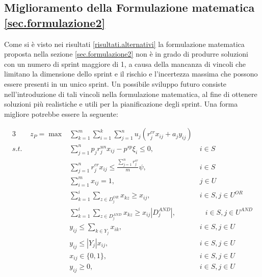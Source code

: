 \documentclass[12pt,a4paper,openright,twoside]{book}
\begin{document}
\subsection{Miglioramento della Formulazione matematica \ref{sec.formulazione2}}

Come si è visto nei risultati \ref{risultati.alternativi} la formulazione matematica proposta nella sezione \ref{sec.formulazione2} non è in grado di produrre soluzioni con un numero di sprint maggiore di 1, a causa della mancanza di vincoli che limitano la dimensione dello sprint e il rischio e l'incertezza massima che possono essere presenti in un unico sprint.
Un possibile sviluppo futuro consiste nell'introduzione di tali vincoli nella formulazione matematica, al fine di ottenere soluzioni più realistiche e utili per la pianificazione degli sprint.
Una forma migliore potrebbe essere la seguente:

\begin{alignat}{3}
 \qquad z_P  = \max  & \sum_{k=1}^m \sum_{i=1}^{k} \sum_{j=1}^{n} u_j \left( r_j^{cr} x_{ij} + a_j y_{ij} \right)
                                                                               &\                        \label{Eq6.P1}\\
  s.t.\ & \sum_{j=1}^{n} p_j r_j^{un} x_{ij} - p^{sp} \xi_{i}  \leq 0,                   &\ i \in S                \label{Eq6.P2}\\
        & \sum_{j=1}^{n} r_j^{cr} x_{ij} \leq \frac{\sum_{j=1}^{n} r_j^{cr}}{m} \psi,                   &\ i \in S                \label{Eq6.P3}\\
        & \sum_{i=1}^{m} x_{ij} = 1,                                           &\ j \in U                \label{Eq6.P4}\\
        & \sum_{k=1}^{i} \sum_{z \in D_j^{OR}} x_{kz} \geq x_{ij},             &\ i \in S, j \in U^{OR}  \label{Eq6.P5}\\
        & \sum_{k=1}^{i} \sum_{z \in D_j^{AND}} x_{kz} \geq x_{ij}|D_j^{AND}|, &\quad i \in S, j \in U^{AND} \label{Eq6.P6}\\
        & y_{ij} \leq \sum_{k \in Y_j} x_{ik},                                 &\ i \in S, j \in U       \label{Eq6.P7}\\
        & y_{ij} \leq |Y_j| x_{ij},                                            &\ i \in S, j \in U       \label{Eq6.P8}\\
        & x_{ij} \in \{0,1\},                                                  &\ i \in S, j \in U       \label{Eq6.P9}\\
        & y_{ij} \geq 0,                                                       &\ i \in S, j \in U       \label{Eq6.P10}
\end{alignat}
\end{document}
